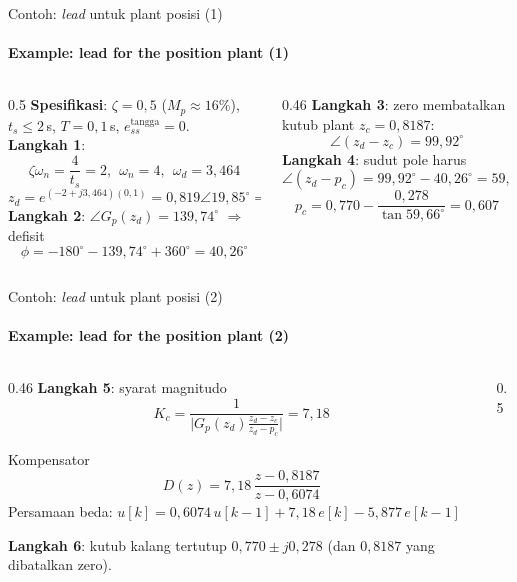 \documentclass[aspectratio=169,10pt]{beamer}
\begin{document}
\begin{frame}{Contoh: \textit{lead} untuk plant posisi (1)}
	\framesubtitle{Example: lead for the position plant (1)}
	\begin{columns}[T]
		\begin{column}{0.5\textwidth}
			\small
			\textbf{Spesifikasi}: $\zeta = 0{,}5$ ($M_p \approx 16\%$), $t_s \le 2$\,s, $T=0{,}1$\,s, $e_{ss}^{\text{tangga}} = 0$.\\[4pt]
			\textbf{Langkah 1}:
			\[
				\zeta\omega_n = \frac{4}{t_s} = 2,\ \ \omega_n = 4,\ \ \omega_d = 3{,}464
			\]
			\[
				z_d = e^{(-2+j3{,}464)(0{,}1)} = 0{,}819\angle19{,}85^\circ = 0{,}770 + j0{,}278
			\]
			\textbf{Langkah 2}: $\angle G_p(z_d) = 139{,}74^\circ$ $\Rightarrow$ defisit
			\[
				\phi = -180^\circ - 139{,}74^\circ + 360^\circ = 40{,}26^\circ
			\]
		\end{column}
		\begin{column}{0.46\textwidth}
			\small
			\textbf{Langkah 3}: zero membatalkan kutub plant $z_c = 0{,}8187$:
			\[
				\angle(z_d - z_c) = 99{,}92^\circ
			\]
			\textbf{Langkah 4}: sudut pole harus
			\[
				\angle(z_d - p_c) = 99{,}92^\circ - 40{,}26^\circ = 59{,}66^\circ
			\]
			\[
				p_c = 0{,}770 - \frac{0{,}278}{\tan 59{,}66^\circ} = 0{,}607
			\]
		\end{column}
	\end{columns}
\end{frame}

\begin{frame}{Contoh: \textit{lead} untuk plant posisi (2)}
	\framesubtitle{Example: lead for the position plant (2)}
	\begin{columns}[T]
		\begin{column}{0.46\textwidth}
			\small
			\textbf{Langkah 5}: syarat magnitudo
			\[
				K_c = \frac{1}{\big|G_p(z_d)\frac{z_d-z_c}{z_d-p_c}\big|} = 7{,}18
			\]
			\begin{block}{Kompensator}
				\[
					D(z) = 7{,}18\,\frac{z - 0{,}8187}{z - 0{,}6074}
				\]
				\scriptsize Persamaan beda: $u[k] = 0{,}6074\,u[k-1] + 7{,}18\,e[k] - 5{,}877\,e[k-1]$
			\end{block}
			\textbf{Langkah 6}: kutub kalang tertutup $0{,}770\pm j0{,}278$ (dan $0{,}8187$ yang dibatalkan zero).
		\end{column}
		\begin{column}{0.5\textwidth}
			\centering
		\end{column}
	\end{columns}
\end{frame}
\end{document}
